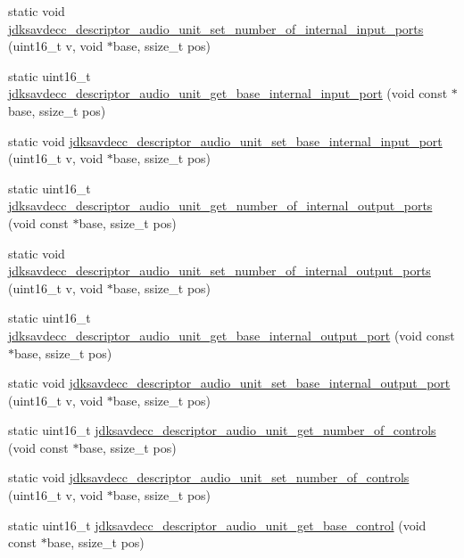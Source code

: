 \begin{DoxyCompactItemize}
static void \hyperlink{group__descriptor__audio_gab25473ecc94044e36d5747cc379aab06}{jdksavdecc\+\_\+descriptor\+\_\+audio\+\_\+unit\+\_\+set\+\_\+number\+\_\+of\+\_\+internal\+\_\+input\+\_\+ports} (uint16\+\_\+t v, void $\ast$base, ssize\+\_\+t pos)
\item 
static uint16\+\_\+t \hyperlink{group__descriptor__audio_gad0999b21ae1bfa305283ea182062d33b}{jdksavdecc\+\_\+descriptor\+\_\+audio\+\_\+unit\+\_\+get\+\_\+base\+\_\+internal\+\_\+input\+\_\+port} (void const $\ast$base, ssize\+\_\+t pos)
\item 
static void \hyperlink{group__descriptor__audio_gaf7ddda9ae178313c6f64a083d9fc4fb1}{jdksavdecc\+\_\+descriptor\+\_\+audio\+\_\+unit\+\_\+set\+\_\+base\+\_\+internal\+\_\+input\+\_\+port} (uint16\+\_\+t v, void $\ast$base, ssize\+\_\+t pos)
\item 
static uint16\+\_\+t \hyperlink{group__descriptor__audio_ga1de6c495fd0b6f7fc154195e65a4e293}{jdksavdecc\+\_\+descriptor\+\_\+audio\+\_\+unit\+\_\+get\+\_\+number\+\_\+of\+\_\+internal\+\_\+output\+\_\+ports} (void const $\ast$base, ssize\+\_\+t pos)
\item 
static void \hyperlink{group__descriptor__audio_ga2492dcb566024f8324164c5c0d908302}{jdksavdecc\+\_\+descriptor\+\_\+audio\+\_\+unit\+\_\+set\+\_\+number\+\_\+of\+\_\+internal\+\_\+output\+\_\+ports} (uint16\+\_\+t v, void $\ast$base, ssize\+\_\+t pos)
\item 
static uint16\+\_\+t \hyperlink{group__descriptor__audio_ga6b0b0324ff6e4bb78babe7c0dc305e60}{jdksavdecc\+\_\+descriptor\+\_\+audio\+\_\+unit\+\_\+get\+\_\+base\+\_\+internal\+\_\+output\+\_\+port} (void const $\ast$base, ssize\+\_\+t pos)
\item 
static void \hyperlink{group__descriptor__audio_gaf43b0352707be48aca5252c2efeb9b6c}{jdksavdecc\+\_\+descriptor\+\_\+audio\+\_\+unit\+\_\+set\+\_\+base\+\_\+internal\+\_\+output\+\_\+port} (uint16\+\_\+t v, void $\ast$base, ssize\+\_\+t pos)
\item 
static uint16\+\_\+t \hyperlink{group__descriptor__audio_gad33aa5ef5f5e9f0db7d89afd6e820ff5}{jdksavdecc\+\_\+descriptor\+\_\+audio\+\_\+unit\+\_\+get\+\_\+number\+\_\+of\+\_\+controls} (void const $\ast$base, ssize\+\_\+t pos)
\item 
static void \hyperlink{group__descriptor__audio_gaaf686592bbcbd17e9fa1f01ce283903a}{jdksavdecc\+\_\+descriptor\+\_\+audio\+\_\+unit\+\_\+set\+\_\+number\+\_\+of\+\_\+controls} (uint16\+\_\+t v, void $\ast$base, ssize\+\_\+t pos)
\item 
static uint16\+\_\+t \hyperlink{group__descriptor__audio_ga440b65f044454a6b9e4fb0a4144c58b2}{jdksavdecc\+\_\+descriptor\+\_\+audio\+\_\+unit\+\_\+get\+\_\+base\+\_\+control} (void const $\ast$base, ssize\+\_\+t pos)

\end{DoxyCompactItemize}
